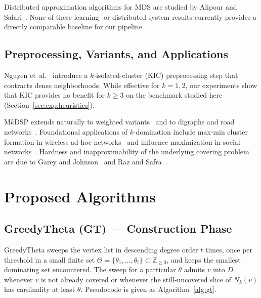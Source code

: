 \documentclass[11pt,a4paper]{article}
\begin{document}
Distributed approximation algorithms for MDS are studied by Alipour
and Salari~\cite{alipour2021}. None of these learning- or
distributed-system results currently provides a directly comparable
baseline for our pipeline.

\subsection{Preprocessing, Variants, and Applications}

Nguyen et~al.~\cite{nguyen2020} introduce a $k$-isolated-cluster (KIC)
preprocessing step that contracts dense neighborhoods. While effective
for $k=1,2$, our experiments show that KIC provides no benefit for
$k\ge 3$ on the benchmark studied here
(Section~\ref{sec:exp:heuristics}).

M$k$DSP extends naturally to weighted
variants~\cite{barrena2025} and to digraphs and road
networks~\cite{dijkstra2024}. Foundational applications of
$k$-domination include max-min cluster formation in wireless ad-hoc
networks~\cite{amis2000} and influence maximization in
social networks~\cite{kempe2003}. Hardness and inapproximability of
the underlying covering problem are due to Garey and
Johnson~\cite{garey1979} and Raz and Safra~\cite{raz1997}.


\section{Proposed Algorithms}
\label{sec:algo}

\subsection{GreedyTheta (GT) — Construction Phase}

GreedyTheta sweeps the vertex list in descending degree order $t$
times, once per threshold in a small finite set
$\Theta=\{\theta_1,\ldots,\theta_t\}\subset\mathbb{Z}_{\ge 0}$, and
keeps the smallest dominating set encountered. The sweep for a
particular $\theta$ admits $v$ into $D$ whenever $v$ is not already
covered or whenever the still-uncovered slice of $N_k(v)$ has
cardinality at least $\theta$. Pseudocode is given as
Algorithm~\ref{alg:gt}.
\end{document}
